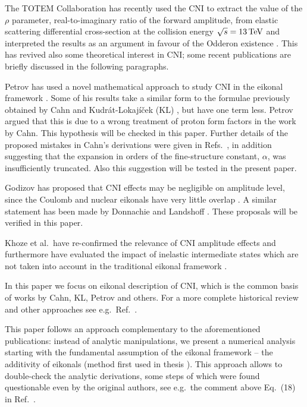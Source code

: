 \documentclass[pdftex,twocolumn,epjc3]{svjour3}
\def\un#1{\,{\rm #1}}
\begin{document}
The TOTEM Collaboration has recently used the CNI to extract the value of the $\rho$ parameter, real-to-imaginary ratio of the forward amplitude, from elastic scattering differential cross-section at the collision energy $\sqrt s = 13\un{TeV}$ and interpreted the results as an argument in favour of the Odderon existence \cite{totem-13tev-rho}. This has revived also some theoretical interest in CNI; some recent publications are briefly discussed in the following paragraphs.

Petrov has used a novel mathematical approach to study CNI in the eikonal framework \cite{petrov2018,petrov2018-erratum}. Some of his results take a similar form to the formulae previously obtained by Cahn \cite{cahn82} and Kudr\'at-Lokaj\'i\v cek (KL) \cite{kl94}, but have one term less. Petrov argued that this is due to a wrong treatment of proton form factors in the work by Cahn. This hypothesis will be checked in this paper. Further details of the proposed mistakes in Cahn's derivations were given in Refs.~\cite{petrov2019,petrov2020}, in addition suggesting that the expansion in orders of the fine-structure constant, $\alpha$, was insufficiently truncated. Also this suggestion will be tested in the present paper.

Godizov has proposed that CNI effects may be negligible on amplitude level, since the Coulomb and nuclear eikonals have very little overlap \cite{godizov2019}. A similar statement has been made by Donnachie and Landshoff \cite{donnachie2019}. These proposals will be verified in this paper.

Khoze et al.~have re-confirmed the relevance of CNI amplitude effects and furthermore have evaluated the impact of inelastic intermediate states which are not taken into account in the traditional eikonal framework \cite{kmr2019}.

In this paper we focus on eikonal description of CNI, which is the common basis of works by Cahn, KL, Petrov and others. For a more complete historical review and other approaches see e.g.~Ref.~\cite{thesis}.

This paper follows an approach complementary to the aforementioned publications: instead of analytic manipulations, we present a numerical analysis starting with the fundamental assumption of the eikonal framework -- the additivity of eikonals (method first used in thesis \cite{thesis}). This approach allows to double-check the analytic derivations, some steps of which were found questionable even by the original authors, see e.g.~the comment above Eq.~(18) in Ref.~\cite{cahn82}.
\end{document}
